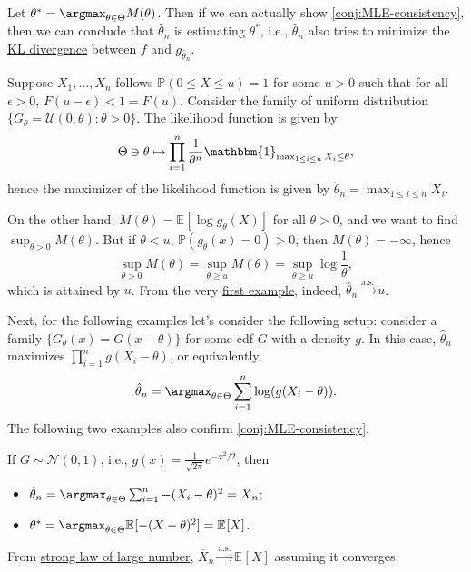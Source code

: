 Let \(\theta ^{\ast} = \argmax_{\theta \in \Theta } M(\theta )\). Then if we can actually show \autoref{conj:MLE-consistency}, then we can conclude that \(\hat{\theta} _n\) is estimating \(\theta ^{\ast} \), i.e., \(\hat{\theta} _n\) also tries to minimize the \href{https://en.wikipedia.org/wiki/Kullback%E2%80%93Leibler_divergence}{KL divergence} between \(f\) and \(g_{\hat{\theta} _n}\).

\begin{eg}\label{eg:supremum-estimation-MLE}
	Suppose \(X_1, \dots , X_n\) follows \(\mathbb{P} (0 \leq X \leq u) = 1\) for some \(u > 0\) such that for all \(\epsilon >0\), \(F(u - \epsilon ) < 1 = F(u)\). Consider the family of uniform distribution \(\{ G_\theta = \mathcal{U} (0, \theta ) \colon \theta > 0\} \). The likelihood function is given by
	\[
		\Theta \ni \theta
		\mapsto \prod_{i=1}^{n} \frac{1}{\theta ^n} \mathbbm{1}_{\max _{1 \leq i \leq n} X_i \leq \theta },
	\]
	hence the maximizer of the likelihood function is given by \(\hat{\theta} _n = \max _{1 \leq i \leq n} X_i\).

	On the other hand, \(M(\theta ) = \mathbb{E}_{}[\log g_\theta (X)] \) for all \(\theta  > 0\), and we want to find \(\sup _{\theta > 0} M(\theta )\). But if \(\theta < u\), \(\mathbb{P} (g_\theta (x) = 0) > 0\), then \(M(\theta ) = -\infty \), hence
	\[
		\sup _{\theta > 0} M(\theta )
		= \sup _{\theta \geq u} M(\theta )
		= \sup _{\theta \geq u} \log \frac{1}{\theta },
	\]
	which is attained by \(u\). From the very \hyperref[eg:supremum-estimation]{first example}, indeed, \(\hat{\theta} _n \overset{\text{a.s.} }{\to} u\).
\end{eg}

Next, for the following examples let's consider the following setup: consider a family \(\{ G_\theta (x) = G(x - \theta ) \}\) for some cdf \(G\) with a density \(g\). In this case, \(\hat{\theta} _n\) maximizes \(\prod_{i=1}^{n} g(X_i - \theta )\), or equivalently,
\[
	\hat{\theta} _n
	= \argmax_{\theta \in \Theta } \sum_{i=1}^{n} \log (g(X_i - \theta )).
\]
The following two examples also confirm \autoref{conj:MLE-consistency}.

\begin{eg}[Normal]
	If \(G \sim \mathcal{N} (0, 1)\), i.e., \(g(x) = \frac{1}{\sqrt{2\pi } } e^{- x^2 / 2}\), then
	\begin{itemize}
		\item \(\hat{\theta} _n = \argmax_{\theta \in \Theta } \sum_{i=1}^{n} - (X_i - \theta )^2 = \overline{X} _n\);
		\item \(\theta ^{\ast} = \argmax_{\theta \in \Theta } \mathbb{E}_{}[-(X - \theta )^2] = \mathbb{E}_{}[X] \).
	\end{itemize}
	From \hyperref[thm:SLLN]{strong law of large number}, \(\overline{X} _n \overset{\text{a.s.} }{\to} \mathbb{E}_{}[X] \) assuming it converges.
\end{eg}

